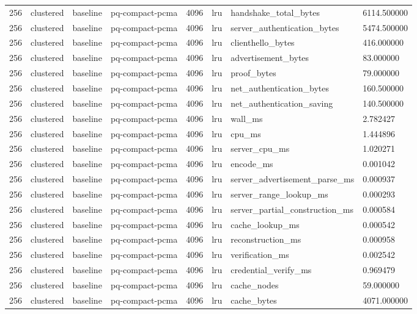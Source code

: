 \begin{tabular}{llllllll}
256 & clustered & baseline & pq-compact-pcma & 4096 & lru & handshake\_total\_bytes & 6114.500000 \\
256 & clustered & baseline & pq-compact-pcma & 4096 & lru & server\_authentication\_bytes & 5474.500000 \\
256 & clustered & baseline & pq-compact-pcma & 4096 & lru & clienthello\_bytes & 416.000000 \\
256 & clustered & baseline & pq-compact-pcma & 4096 & lru & advertisement\_bytes & 83.000000 \\
256 & clustered & baseline & pq-compact-pcma & 4096 & lru & proof\_bytes & 79.000000 \\
256 & clustered & baseline & pq-compact-pcma & 4096 & lru & net\_authentication\_bytes & 160.500000 \\
256 & clustered & baseline & pq-compact-pcma & 4096 & lru & net\_authentication\_saving & 140.500000 \\
256 & clustered & baseline & pq-compact-pcma & 4096 & lru & wall\_ms & 2.782427 \\
256 & clustered & baseline & pq-compact-pcma & 4096 & lru & cpu\_ms & 1.444896 \\
256 & clustered & baseline & pq-compact-pcma & 4096 & lru & server\_cpu\_ms & 1.020271 \\
256 & clustered & baseline & pq-compact-pcma & 4096 & lru & encode\_ms & 0.001042 \\
256 & clustered & baseline & pq-compact-pcma & 4096 & lru & server\_advertisement\_parse\_ms & 0.000937 \\
256 & clustered & baseline & pq-compact-pcma & 4096 & lru & server\_range\_lookup\_ms & 0.000293 \\
256 & clustered & baseline & pq-compact-pcma & 4096 & lru & server\_partial\_construction\_ms & 0.000584 \\
256 & clustered & baseline & pq-compact-pcma & 4096 & lru & cache\_lookup\_ms & 0.000542 \\
256 & clustered & baseline & pq-compact-pcma & 4096 & lru & reconstruction\_ms & 0.000958 \\
256 & clustered & baseline & pq-compact-pcma & 4096 & lru & verification\_ms & 0.002542 \\
256 & clustered & baseline & pq-compact-pcma & 4096 & lru & credential\_verify\_ms & 0.969479 \\
256 & clustered & baseline & pq-compact-pcma & 4096 & lru & cache\_nodes & 59.000000 \\
256 & clustered & baseline & pq-compact-pcma & 4096 & lru & cache\_bytes & 4071.000000 \\

\end{tabular}
